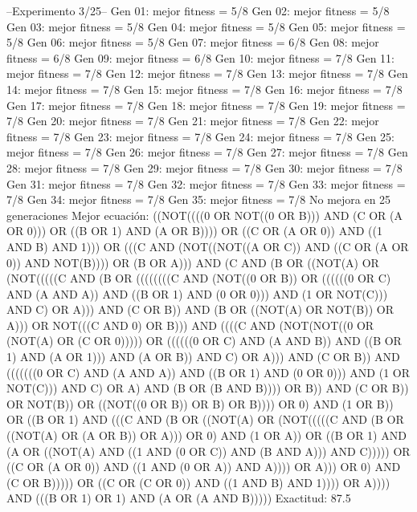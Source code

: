 --Experimento 
 3/25--
Gen 01: mejor fitness = 5/8
Gen 02: mejor fitness = 5/8
Gen 03: mejor fitness = 5/8
Gen 04: mejor fitness = 5/8
Gen 05: mejor fitness = 5/8
Gen 06: mejor fitness = 5/8
Gen 07: mejor fitness = 6/8
Gen 08: mejor fitness = 6/8
Gen 09: mejor fitness = 6/8
Gen 10: mejor fitness = 7/8
Gen 11: mejor fitness = 7/8
Gen 12: mejor fitness = 7/8
Gen 13: mejor fitness = 7/8
Gen 14: mejor fitness = 7/8
Gen 15: mejor fitness = 7/8
Gen 16: mejor fitness = 7/8
Gen 17: mejor fitness = 7/8
Gen 18: mejor fitness = 7/8
Gen 19: mejor fitness = 7/8
Gen 20: mejor fitness = 7/8
Gen 21: mejor fitness = 7/8
Gen 22: mejor fitness = 7/8
Gen 23: mejor fitness = 7/8
Gen 24: mejor fitness = 7/8
Gen 25: mejor fitness = 7/8
Gen 26: mejor fitness = 7/8
Gen 27: mejor fitness = 7/8
Gen 28: mejor fitness = 7/8
Gen 29: mejor fitness = 7/8
Gen 30: mejor fitness = 7/8
Gen 31: mejor fitness = 7/8
Gen 32: mejor fitness = 7/8
Gen 33: mejor fitness = 7/8
Gen 34: mejor fitness = 7/8
Gen 35: mejor fitness = 7/8
No mejora en 25 generaciones
Mejor ecuación: ((NOT((((0 OR NOT((0 OR B))) AND (C OR (A OR 0))) OR ((B OR 1) AND (A OR B)))) OR ((C OR (A OR 0)) AND ((1 AND B) AND 1))) OR (((C AND (NOT((NOT((A OR C)) AND ((C OR (A OR 0)) AND NOT(B)))) OR (B OR A))) AND (C AND (B OR ((NOT(A) OR (NOT(((((C AND (B OR ((((((((C AND (NOT((0 OR B)) OR ((((((0 OR C) AND (A AND A)) AND ((B OR 1) AND (0 OR 0))) AND (1 OR NOT(C))) AND C) OR A))) AND (C OR B)) AND (B OR ((NOT(A) OR NOT(B)) OR A))) OR NOT(((C AND 0) OR B))) AND ((((C AND (NOT(NOT((0 OR (NOT(A) OR (C OR 0))))) OR ((((((0 OR C) AND (A AND B)) AND ((B OR 1) AND (A OR 1))) AND (A OR B)) AND C) OR A))) AND (C OR B)) AND (((((((0 OR C) AND (A AND A)) AND ((B OR 1) AND (0 OR 0))) AND (1 OR NOT(C))) AND C) OR A) AND (B OR (B AND B)))) OR B)) AND (C OR B)) OR NOT(B)) OR ((NOT((0 OR B)) OR B) OR B)))) OR 0) AND (1 OR B)) OR ((B OR 1) AND (((C AND (B OR ((NOT(A) OR (NOT(((((C AND (B OR ((NOT(A) OR (A OR B)) OR A))) OR 0) AND (1 OR A)) OR ((B OR 1) AND (A OR ((NOT(A) AND ((1 AND (0 OR C)) AND (B AND A))) AND C))))) OR ((C OR (A OR 0)) AND ((1 AND (0 OR A)) AND A)))) OR A))) OR 0) AND (C OR B))))) OR ((C OR (C OR 0)) AND ((1 AND B) AND 1)))) OR A)))) AND (((B OR 1) OR 1) AND (A OR (A AND B)))))
 Exactitud: 87.5%

